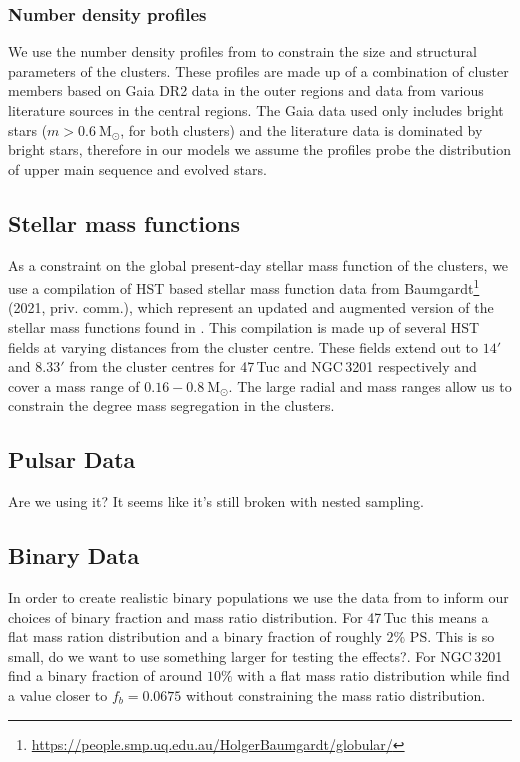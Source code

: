 \subsubsection{Number density profiles}
We use the number density profiles from \citet{DeBoer2019} to constrain the size and structural
parameters of the clusters. These profiles are made up of a combination of cluster members based on
Gaia DR2 data in the outer regions and data from various literature sources in the central regions.
The Gaia data used only includes bright stars ($m > 0.6 \ \mathrm{M}_\odot$, for both clusters) and
the literature data is dominated by bright stars, therefore in our models we assume the profiles
probe the distribution of upper main sequence and evolved stars.

\subsection{Stellar mass functions}

As a constraint on the global present-day stellar mass function of the clusters, we use a
compilation of HST based stellar mass function data from
Baumgardt\footnote{\url{https://people.smp.uq.edu.au/HolgerBaumgardt/globular/}} (2021, priv.
comm.), which represent an updated and augmented version of the stellar mass functions found in
\citet{Sollima2017}. This compilation is made up of several HST fields at varying distances from the
cluster centre. These fields extend out to $14 '$ and $8.33 '$ from the cluster centres for 47\,Tuc
and NGC\,3201 respectively and cover a mass range of $0.16 - 0.8 \ \mathrm{M}_\odot$. The large
radial and mass ranges allow us to constrain the degree mass segregation in the clusters.

\subsection{Pulsar Data}

Are we using it? It seems like it's still broken with nested sampling.

\subsection{Binary Data}


In order to create realistic binary populations we use the data from \citet{Milone2012} to inform
our choices of binary fraction and mass ratio distribution. For 47\,Tuc this means a flat mass
ration distribution and a binary fraction of roughly $2\%$ \ps{This is so small, do we want to use
	something larger for testing the effects?}.  For NGC\,3201 \citet{Milone2012} find a binary fraction
of around $10\%$ with a flat mass ratio distribution while \citet{Giesers2019} find a value closer
to $f_b = 0.0675$ without constraining the mass ratio distribution.





